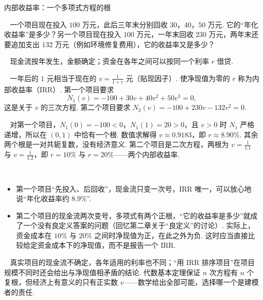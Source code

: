 \documentclass[lang=cn,10.5pt,scheme=chinese,toc=twocol,section,chinesefont=nofont,
twoside,citestyle=gb7714-2015,bibstyle=gb7714-2015]{elegantbook}
\DeclareRobustCommand{\textbf}[1]{{\lnsemiboldlatin\lnsemiboldcjk #1}}
\numberwithin{equation}{section}   %
\newcommand{\mstep}[1]{\par\smallskip\noindent\textbf{【#1】}\ }
\begin{document}
\begin{modelbox}{内部收益率：一个多项式方程的根}
  \mstep{问题} 一个项目现在投入 $100$ 万元，此后三年末分别回收 $30$，$40$，$50$ 万元. 它的“年化收益率”是多少？另一个项目现在投入 $100$ 万元，一年末回收 $230$ 万元，两年末还要追加支出 $132$ 万元（例如环境修复费用），它的收益率又是多少？

  \mstep{假设} 现金流按年发生，金额确定；资金在各年之间可以按同一个利率 $r$ 借贷.

  \mstep{模型} 一年后的 $1$ 元相当于现在的 $v=\frac1{1+r}$ 元（\textbf{贴现因子}）. 使\textbf{净现值}为零的 $r$ 称为\textbf{内部收益率}（IRR）. 第一个项目要求
  \[N_1(v)=-100+30v+40v^2+50v^3=0,\]
  这是关于 $v$ 的三次方程. 第二个项目要求 $N_2(v)=-100+230v-132v^2=0$.

  \mstep{求解} 对第一个项目，$N_1(0)=-100<0$，$N_1(1)=20>0$，且 $v>0$ 时 $N_1$ 严格递增，所以在 $(0,1)$ 中恰有一个根. 数值求解得 $v\approx0.9183$，即 $r\approx8.90\%$. 其余两个根是一对共轭复数，没有经济意义. 第二个项目是二次方程，两根为 $v=\frac1{1.1}$ 与 $v=\frac1{1.2}$，即 $r=10\%$ 与 $r=20\%$——\textbf{两个}内部收益率.

  \mstep{解读}
  \begin{itemize}
    \item 第一个项目“先投入、后回收”，现金流只变一次号，IRR 唯一，可以放心地说“年化收益率约 $8.9\%$”.
    \item 第二个项目的现金流两次变号，多项式有两个正根，“它的收益率是多少”就成了一个没有良定义答案的问题（回忆第二章关于“良定义”的讨论）. 实际上，资金成本在 $10\%$ 与 $20\%$ 之间时净现值为正，在此之外为负. 这时应当直接比较给定资金成本下的净现值，而不是报告一个 IRR.
  \end{itemize}

  \mstep{局限} 真实项目的现金流不确定，各年适用的利率也不同；“用 IRR 排序项目”在项目规模不同时还会给出与净现值相矛盾的结论. 代数基本定理保证 $n$ 次方程有 $n$ 个复根，但经济上有意义的只有正实数 $v$——数学给出全部可能，选择哪一个是建模者的责任.
  \begin{center}
    \label{fig:conjroots}
  \end{center}
\end{modelbox}
\end{document}
